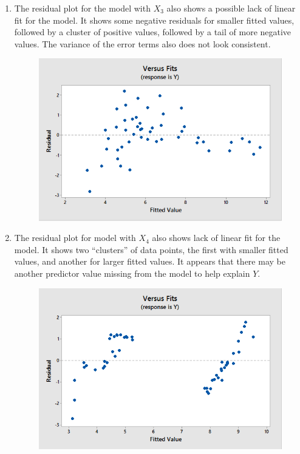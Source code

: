 \documentclass{article}
\begin{document}
\begin{enumerate}
\item
  The residual plot for the model with \(X_3\) also shows a possible
  lack of linear fit for the model. It shows some negative residuals for
  smaller fitted values, followed by a cluster of positive values,
  followed by a tail of more negative values. The variance of the error
  terms also does not look consistent.
  
  \begin{figure}[h!]
 \centering
 \includegraphics[scale=.3]{./images/plot-residuals-vs-fit_y-vs-x3.png}
\end{figure}

\item
  The residual plot for model with \(X_4\) also shows lack of linear fit
  for the model. It shows two ``clusters'' of data points, the first
  with smaller fitted values, and another for larger fitted values. It
  appears that there may be another predictor value missing from the
  model to help explain \(Y\).
  
  \begin{figure}[h!]
 \centering
 \includegraphics[scale=.3]{./images/plot-residuals-vs-fit_y-vs-x4.png}
\end{figure}


\end{enumerate}
\end{document}
